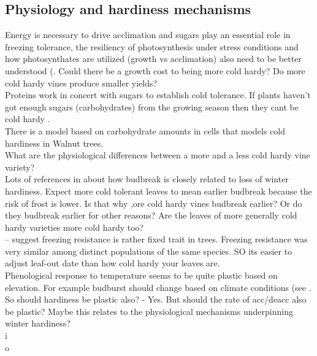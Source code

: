 \documentclass[11pt,letter]{article}
\begin{document}
\subsection{Physiology and hardiness mechanisms}  
Energy is necessary to drive acclimation and sugars play an essential role in freezing tolerance, the
resiliency of photosynthesis under stress conditions and how photosynthates are utilized (growth vs acclimation) also need to be better understood (\citep{Gusta2013}. Could there be a growth cost to being more cold hardy? Do more cold hardy vines produce smaller yields? \\

Proteins work in concert with sugars to establish cold tolerance. If plants haven't got enough sugars (carbohydrates) from the growing season then they cant be cold hardy \citep{Gusta2013}. \\

There is a model based on carbohydrate amounts in cells that models cold hardiness in Walnut trees. \\ 

What are the physiological differences between a more and a less cold hardy vine variety? \\

Lots of references in \cite{Lenz2016} about how budbreak is closely related to loss of winter hardiness. Expect more cold tolerant leaves to mean earlier budbreak because the risk of frost is lower. Is that why ,ore cold hardy vines budbreak earlier? Or do they budbreak earlier for other reasons? Are the leaves of more generally cold hardy varieties more cold hardy too? \\
  
\cite{Lenz2016} – suggest freezing resistance is rather fixed trait in trees. Freezing resistance was very similar among distinct populations of the same species. SO its easier to adjust leaf-out date than how cold hardy your leaves are. \\

Phenological response to temperature seems to be quite plastic based on elevation. For example budburst should change based on climate conditions (see \citep{Caffarra2010}. So should hardiness be plastic also? - Yes. But should the rate of acc/deacc also be plastic? Maybe this relates to the physiological mechanisms underpinning winter hardiness? \\

i\\
o\\
\\
\end{document}

